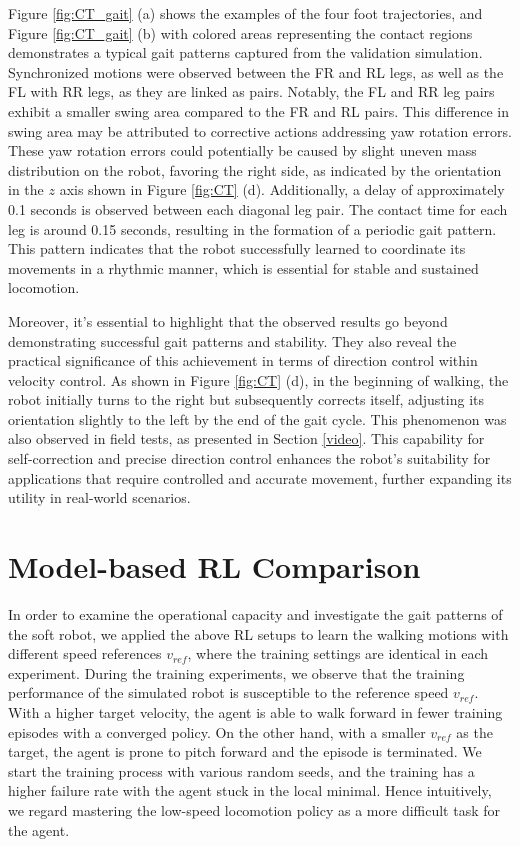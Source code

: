 Figure \ref{fig:CT_gait} (a) shows the examples of the four foot trajectories, and Figure \ref{fig:CT_gait} (b) with colored areas representing the contact regions demonstrates a typical gait patterns captured from the validation simulation. Synchronized motions were observed between the FR and RL legs, as well as the FL with RR legs, as they are linked as pairs. Notably, the FL and RR leg pairs exhibit a smaller swing area compared to the FR and RL pairs. This difference in swing area may be attributed to corrective actions addressing yaw rotation errors. These yaw rotation errors could potentially be caused by slight uneven mass distribution on the robot, favoring the right side, as indicated by the orientation in the $z$ axis shown in Figure \ref{fig:CT} (d). Additionally, a delay of approximately 0.1 seconds is observed between each diagonal leg pair. The contact time for each leg is around 0.15 seconds, resulting in the formation of a periodic gait pattern. This pattern indicates that the robot successfully learned to coordinate its movements in a rhythmic manner, which is essential for stable and sustained locomotion.



Moreover, it's essential to highlight that the observed results go beyond demonstrating successful gait patterns and stability. They also reveal the practical significance of this achievement in terms of direction control within velocity control. As shown in Figure \ref{fig:CT} (d), in the beginning of walking, the robot initially turns to the right but subsequently corrects itself, adjusting its orientation slightly to the left by the end of the gait cycle. This phenomenon was also observed in field tests, as presented in Section \ref{video}. This capability for self-correction and precise direction control enhances the robot's suitability for applications that require controlled and accurate movement, further expanding its utility in real-world scenarios. 


\section{Model-based RL Comparison}
\label{Sec:MBRL}

In order to examine the operational capacity and investigate the gait patterns of the soft robot, we applied the above RL setups to learn the walking motions with different speed references $v_{ref}$, where the training settings are identical in each experiment. During the training experiments, we observe that the training performance of the simulated robot is susceptible to the reference speed $v_{ref}$. With a higher target velocity, the agent is able to walk forward in fewer training episodes with a converged policy. On the other hand, with a smaller $v_{ref}$ as the target, the agent is prone to pitch forward and the episode is terminated. We start the training process with various random seeds, and the training has a higher failure rate with the agent stuck in the local minimal. Hence intuitively, we regard mastering the low-speed locomotion policy as a more difficult task for the agent.

